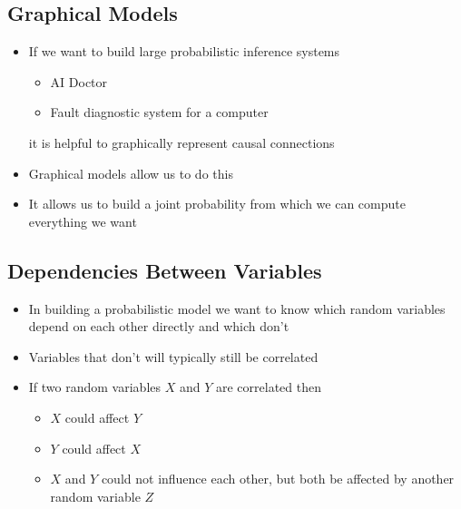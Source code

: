 \begin{slide}
\section{Graphical Models}

\begin{PauseHighLight}
  \begin{itemize}
  \item If we want to build large probabilistic inference systems
    \begin{itemize}
    \item AI Doctor
    \item Fault diagnostic system for a computer
    \end{itemize}
    it is helpful to graphically represent causal connections\pause
  \item Graphical models allow us to do this\pause
  \item It allows us to build a joint probability from which we can
    compute everything we want\pause
  \end{itemize}
\end{PauseHighLight}

\end{slide}




\begin{slide}
\section{Dependencies Between Variables}

\begin{PauseHighLight}
  \begin{itemize}
  \item In building a probabilistic model we want to know which random
    variables depend on each other directly and which don't\pause
  \item Variables that don't will typically still be correlated\pause
  \item If two random variables $X$ and $Y$ are correlated then
    \begin{itemize}
    \item $X$ could affect $Y$
    \item $Y$ could affect $X$
    \item $X$ and $Y$ could not influence each other, but both be
      affected by another random variable $Z$\pause
    \end{itemize}
  \end{itemize}
\end{PauseHighLight}

\end{slide}

